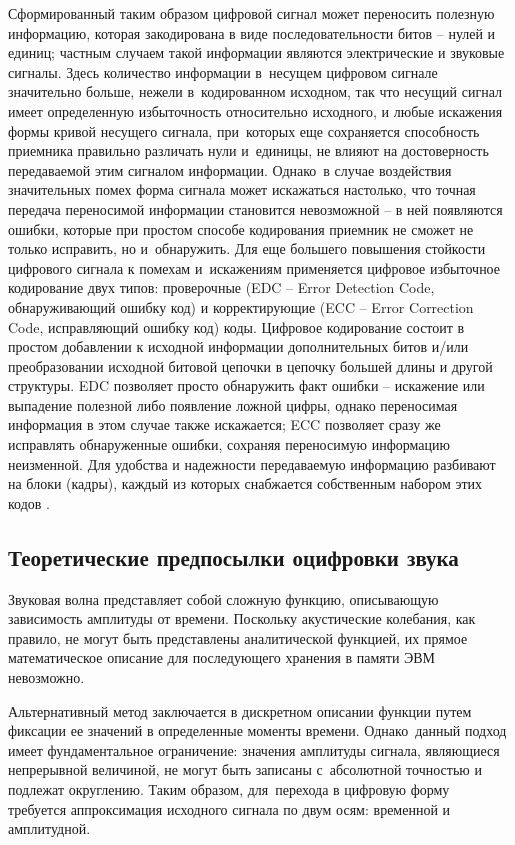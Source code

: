 \documentclass{ou}
\begin{document}
Сформированный таким образом цифровой сигнал может переносить полезную информацию, которая закодирована в виде последовательности битов -- нулей и единиц; частным случаем такой информации являются электрические и звуковые сигналы. Здесь количество информации в~несущем цифровом сигнале значительно больше, нежели в~кодированном исходном, так что несущий сигнал имеет определенную избыточность относительно исходного, и любые искажения формы кривой несущего сигнала, при~которых еще сохраняется способность приемника правильно различать нули и~единицы, не влияют на достоверность передаваемой этим сигналом информации. Однако~в случае воздействия значительных помех форма сигнала может искажаться настолько, что точная передача переносимой информации становится невозможной -- в ней появляются ошибки, которые при простом способе кодирования приемник не сможет не только исправить, но и~обнаружить. Для еще большего повышения стойкости цифрового сигнала к помехам и~искажениям применяется цифровое избыточное кодирование двух типов: проверочные (EDC -- Error Detection Code, обнаруживающий ошибку код) и корректирующие (ECC -- Error Correction Code, исправляющий ошибку код) коды. Цифровое кодирование состоит в простом добавлении к исходной информации дополнительных битов и/или преобразовании исходной битовой цепочки в цепочку большей длины и другой структуры. EDC позволяет просто обнаружить факт ошибки -- искажение или выпадение полезной либо появление ложной цифры, однако переносимая информация в этом случае также искажается; ECC позволяет сразу же исправлять обнаруженные ошибки, сохраняя переносимую информацию неизменной. Для удобства и надежности передаваемую информацию разбивают на блоки (кадры), каждый из которых снабжается собственным набором этих кодов \cite{3dnews}.
\subsection{Теоретические предпосылки оцифровки звука}
Звуковая волна представляет собой сложную функцию, описывающую зависимость амплитуды от времени. Поскольку акустические колебания, как правило, не могут быть представлены аналитической функцией, их прямое математическое описание для последующего хранения в памяти ЭВМ невозможно.

Альтернативный метод заключается в дискретном описании функции путем фиксации ее значений в определенные моменты времени. Однако~данный подход имеет фундаментальное ограничение: значения амплитуды сигнала, являющиеся непрерывной величиной, не могут быть записаны с~абсолютной точностью и подлежат округлению. Таким образом, для~перехода в цифровую форму требуется аппроксимация исходного сигнала по двум осям: временной и амплитудной\cite{spravochnik}.
\end{document}
